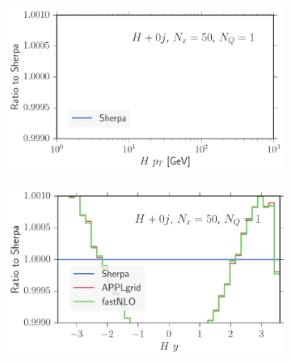 \begin{figure}
\centering
\begin{subfigure}[]{0.49\textwidth}
	\includegraphics[width=\textwidth]{images/hvi_hpt.pdf}
\end{subfigure}
\begin{subfigure}[]{0.49\textwidth}
	\includegraphics[width=\textwidth]{images/hvi_hy.pdf}
\end{subfigure}


\end{figure}
